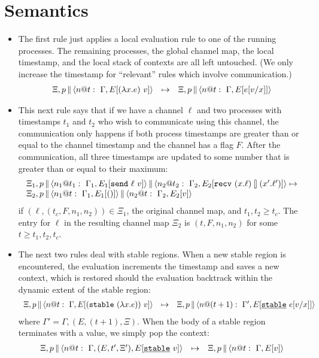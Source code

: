 \documentclass{article}
\begin{document}
\section{Semantics} 

\begin{itemize}
\item The first rule just applies a local evaluation rule to one of the
  running processes. The remaining processes, the global channel map, the
  local timestamp, and the local stack of contexts are all left
  untouched. (We only increase the timestamp for ``relevant'' rules which
  involve communication.)
\[\begin{array}{rcl}
  \Xi,\parc{p}{\proc{n}{\Gamma}{E[(\lambda x.e)~v]}{t}} &\mapsto& 
  \Xi,\parc{p}{\proc{n}{\Gamma}{E[e[v/x]]}{t}}
\end{array}\]

\item This next rule says that if we have a channel $\ell$ and two processes
  with timestamps $t_1$ and $t_2$ who wish to communicate using this channel,
  the communication only happens if both process timestamps are greater than
  or equal to the channel timestamp and the channel has a flag $F$. After the
  communication, all three timestamps are updated to some number that is
  greater than or equal to their maximum:
\[\begin{array}{l}
  \Xi_1,\parc{p}
  {\parc{\proc{n_1}{\Gamma_1}{E_1[\send{\ell}{v}]}{t_1}}
        {\proc{n_2}{\Gamma_2}{E_2[\recv{x}{\ell}{x'}{\ell'}]}{t_2}}}
  \mapsto \\
  \Xi_2,\parc{p}{\parc{\proc{n_1}{\Gamma_1}{E_1[()]}{t}}
    {\proc{n_2}{\Gamma_2}{E_2[v]}{t}}}
\end{array}\]
if $(\ell,(t_{c},F,n_1,n_2)) \in \Xi_1$, the original channel map, and $t_1,t_2
\geq t_c$. The entry for $\ell$ in the resulting channel map 
$\Xi_2$ is $(t,F,n_1,n_2)$ for some $t \geq t_1, t_2, t_c$.

\item The next two rules deal with stable regions. When a new stable region
  is encountered, the evaluation increments the timestamp and saves a new
  context, which is restored should the evaluation backtrack within the
  dynamic extent of the stable region:
\[\begin{array}{rcl}
  \Xi,\parc{p}{\proc{n}{\Gamma}{E[(\stable{(\lambda x.e)})~v]}{t}} &\mapsto&
  \Xi,\parc{p}{\proc{n}{\Gamma'}{E[\stableu{e[v/x]}]}{(t+1)}} 
\end{array}\]
where $\Gamma' = \Gamma,(E,(t+1),\Xi)$. When the body of a stable 
region terminates with a value, we simply pop the context:
\[\begin{array}{rcl}
  \Xi,\parc{p}{\proc{n}{\Gamma,(E,t',\Xi')}{E[\stableu{v}]}{t}} 
  &\mapsto& 
  \Xi,\parc{p}{\proc{n}{\Gamma}{E[v]}{t}} 
\end{array}\]


\end{itemize}
\end{document}
